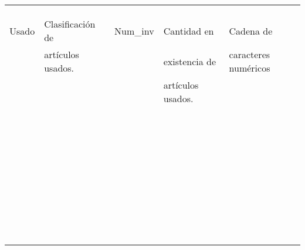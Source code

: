 \documentclass{article}
\begin{document}
\begin{table}[h]
{\begin{tabular}{|l|l|l|l|l|}
 & & & &\\
 & & & &\\
 & & & &\\
Usado & Clasificaci\'on de & Num\_inv & Cantidad en & Cadena de \\
 & art\'iculos usados. & & existencia de & caracteres num\'ericos\\
 & & & art\'iculos usados. & \\ \cline{3-5}
 & & & &\\
 & & & &\\
 & & & &\\
 & & & &\\
 & & & &\\
 & & & &\\
 & & & &\\
 & & & &\\
 & & & &\\
 & & & &\\
 & & & &\\
 & & & &\\
 & & & &\\
 & & & &\\
 & & & &\\
 & & & &\\
 & & & &\\
 & & & &\\
 & & & &\\
 & & & &\\
 & & & &\\
 & & & &\\
 & & & &\\
 & & & &\\
 & & & &\\
 & & & &\\
 & & & &\\
 & & & &\\
 & & & &\\
 & & & &\\
 & & & &\\
 & & & &\\
 & & & &\\
 & & & &\\
 & & & &\\
 & & & &\\
 & & & &\\
 & & & &\\
 & & & &\\
 
 
 \end{tabular}}
\end{table}
\end{document}
